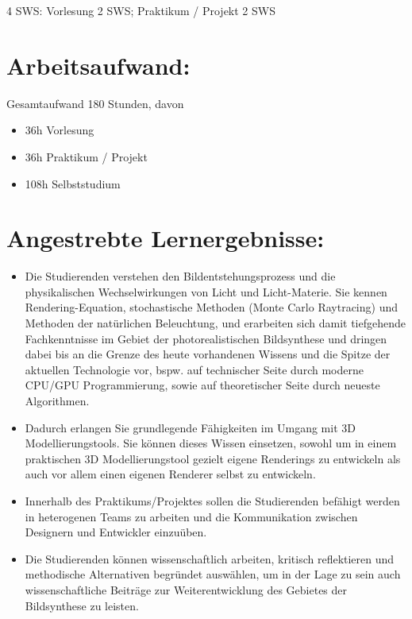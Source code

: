 4 SWS: Vorlesung 2 SWS; Praktikum / Projekt 2 SWS

\section*{Arbeitsaufwand:\label{/mi-2017/modulbeschreibungen-master/MA_VC_Modul_PhotorealistischeBildsynthese}}\label{arbeitsaufwandpathlabelmi-2017modulbeschreibungen-mastermaux5fvcux5fmodulux5fphotorealistischebildsynthese}

Gesamtaufwand 180 Stunden, davon

\begin{itemize}
\tightlist
\item
  36h Vorlesung
\item
  36h Praktikum / Projekt
\item
  108h Selbststudium
\end{itemize}

\section*{Angestrebte
Lernergebnisse:\label{/mi-2017/modulbeschreibungen-master/MA_VC_Modul_PhotorealistischeBildsynthese}}\label{angestrebte-lernergebnissepathlabelmi-2017modulbeschreibungen-mastermaux5fvcux5fmodulux5fphotorealistischebildsynthese}

\begin{itemize}
\tightlist
\item
  Die Studierenden verstehen den Bildentstehungsprozess und die
  physikalischen Wechselwirkungen von Licht und Licht-Materie. Sie
  kennen Rendering-Equation, stochastische Methoden (Monte Carlo
  Raytracing) und Methoden der natürlichen Beleuchtung, und erarbeiten
  sich damit tiefgehende Fachkenntnisse im Gebiet der photorealistischen
  Bildsynthese und dringen dabei bis an die Grenze des heute vorhandenen
  Wissens und die Spitze der aktuellen Technologie vor, bspw. auf
  technischer Seite durch moderne CPU/GPU Programmierung, sowie auf
  theoretischer Seite durch neueste Algorithmen.
\item
  Dadurch erlangen Sie grundlegende Fähigkeiten im Umgang mit 3D
  Modellierungstools. Sie können dieses Wissen einsetzen, sowohl um in
  einem praktischen 3D Modellierungstool gezielt eigene Renderings zu
  entwickeln als auch vor allem einen eigenen Renderer selbst zu
  entwickeln.
\item
  Innerhalb des Praktikums/Projektes sollen die Studierenden befähigt
  werden in heterogenen Teams zu arbeiten und die Kommunikation zwischen
  Designern und Entwickler einzuüben.
\item
  Die Studierenden können wissenschaftlich arbeiten, kritisch
  reflektieren und methodische Alternativen begründet auswählen, um in
  der Lage zu sein auch wissenschaftliche Beiträge zur Weiterentwicklung
  des Gebietes der Bildsynthese zu leisten.
\end{itemize}

